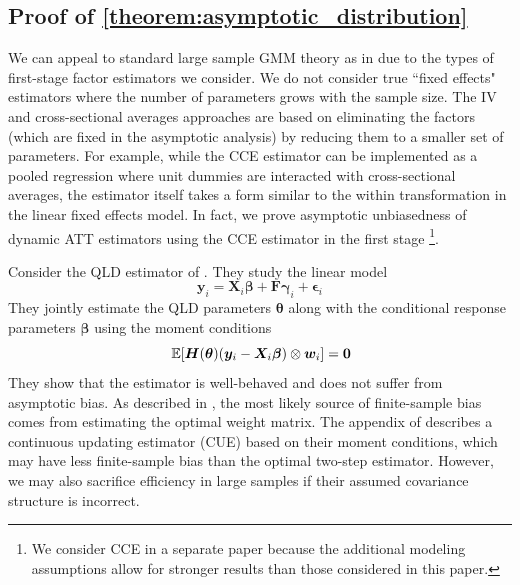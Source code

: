 \documentclass[12pt]{article}
\newcommand{\nick}[1]{\coauthorComment[Nick]{#1}}
\begin{document}
\subsection*{Proof of \autoref{theorem:asymptotic_distribution}}


We can appeal to standard large sample GMM theory as in \citet{Hansen_1982} due to the types of first-stage factor estimators we consider. We do not consider true ``fixed effects" estimators where the number of parameters grows with the sample size. The IV and cross-sectional averages approaches are based on eliminating the factors (which are fixed in the asymptotic analysis) by reducing them to a smaller set of parameters. For example, while the CCE estimator can be implemented as a pooled regression where unit dummies are interacted with cross-sectional averages, the estimator itself takes a form similar to the within transformation in the linear fixed effects model. In fact, we prove asymptotic unbiasedness of dynamic ATT estimators using the CCE estimator in the first stage \citep{Brown_Butts_Westerlund_2023}\footnote{We consider CCE in a separate paper because the additional modeling assumptions allow for stronger results than those considered in this paper.}.

Consider the QLD estimator of \citet{Ahn_Lee_Schmidt_2013}. They study the linear model
\begin{equation}
    \bm y_i = \bm X_i \bm \beta + \bm F \bm \gamma_i + \bm \epsilon_i
\end{equation}
They jointly estimate the QLD parameters $\bm \theta$ along with the conditional response parameters $\bm \beta$ using the moment conditions
\begin{equation}
    \expec{\bm H(\bm \theta) (\bm y_i - \bm X_i \bm \beta) \otimes \bm w_i} = \bm 0
\end{equation}
They show that the estimator is well-behaved and does not suffer from asymptotic bias. As described in \citet{windmeijer2005finite}, the most likely source of finite-sample bias comes from estimating the optimal weight matrix. The appendix of \citet{Ahn_Lee_Schmidt_2013} describes a continuous updating estimator (CUE) based on their moment conditions, which may have less finite-sample bias than the optimal two-step estimator. However, we may also sacrifice efficiency in large samples if their assumed covariance structure is incorrect. 
\end{document}
